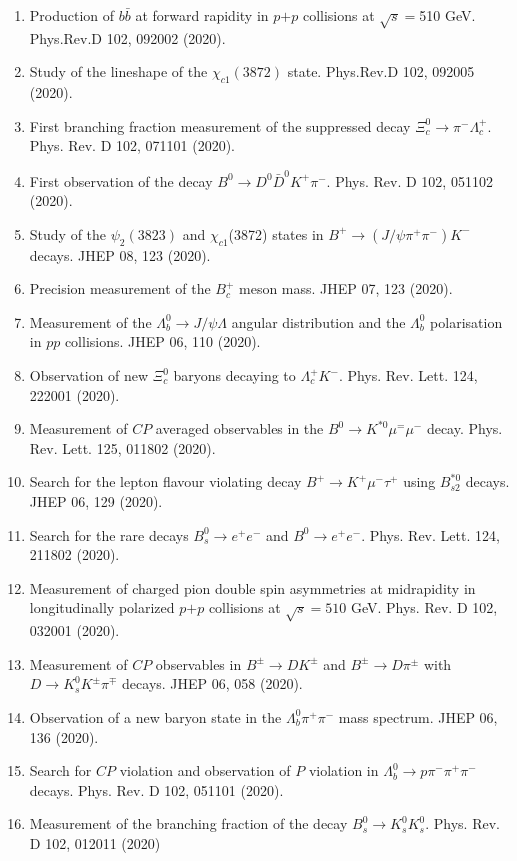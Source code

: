 \documentclass[11pt]{article}
\begin{document}
\begin{flushleft}
\begin{center}
\begin{enumerate}
		\item Production of $b\bar{b}$ at forward rapidity in $p$$+$$p$ collisions at $\sqrt{s}=$510 GeV. Phys.Rev.D 102, 092002 (2020).
		\item Study of the lineshape of the $\chi_{c1}(3872)$ state. Phys.Rev.D 102, 092005 (2020).
		\item First branching fraction measurement of the suppressed decay $\Xi_c^0\to \pi^-\Lambda_c^+$. Phys. Rev. D 102, 071101 (2020).
		\item First observation of the decay $B^0\rightarrow D^0\bar{D}^0K^+\pi^-$. Phys. Rev. D 102, 051102 (2020).
			\item Study of the $\psi_2(3823)$ and $\chi_{c1}$(3872) states in $B^+\to(J/\psi\pi^+\pi^-)K^-$ decays. JHEP 08, 123 (2020).
		\item Precision measurement of the $B_{c}^{+}$ meson mass. JHEP 07, 123 (2020).
			\item Measurement of the $\Lambda^0_b\rightarrow J/\psi\Lambda$ angular distribution and the $\Lambda^0_b$ polarisation in $pp$ collisions. JHEP 06, 110 (2020).
			\item Observation of new $\Xi_c^0$ baryons decaying to $\Lambda_c^+K^-$. Phys. Rev. Lett. 124, 222001 (2020).
			\item Measurement of $CP$ averaged observables in the $B^0\rightarrow K^{*0}\mu^=\mu^-$ decay. Phys. Rev. Lett. 125, 011802 (2020).
			\item Search for the lepton flavour violating decay $B^+\rightarrow K^+\mu^-\tau^+$ using $B_{s2}^{*0}$ decays. JHEP 06, 129 (2020).
		\item Search for the rare decays $B_s^0\rightarrow e^+e^-$ and $B^0\rightarrow e^+e^-$. Phys. Rev. Lett. 124, 211802 (2020).
		\item Measurement of charged pion double spin asymmetries at midrapidity in longitudinally polarized $p$$+$$p$ collisions at $\sqrt{s}=510$ GeV. Phys. Rev. D 102, 032001 (2020).
		\item Measurement of $CP$ observables in $B^\pm\rightarrow DK^\pm$ and $B^\pm\rightarrow D\pi^\pm$ with $D\rightarrow K_s^0K^\pm\pi^\mp$ decays. JHEP 06, 058 (2020).
		\item Observation of a new baryon state in the $\Lambda_b^0\pi^+\pi^-$ mass spectrum. JHEP 06, 136 (2020).
		\item Search for $CP$ violation and observation of $P$ violation in $\Lambda_b^0\rightarrow p\pi^-\pi^+\pi^-$ decays. Phys. Rev. D 102, 051101 (2020).
		\item Measurement of the branching fraction of the decay $B_s^0\rightarrow K_s^0K_s^0$. Phys. Rev. D 102, 012011 (2020)

\end{enumerate}
\end{center}
\end{flushleft}
\end{document}
